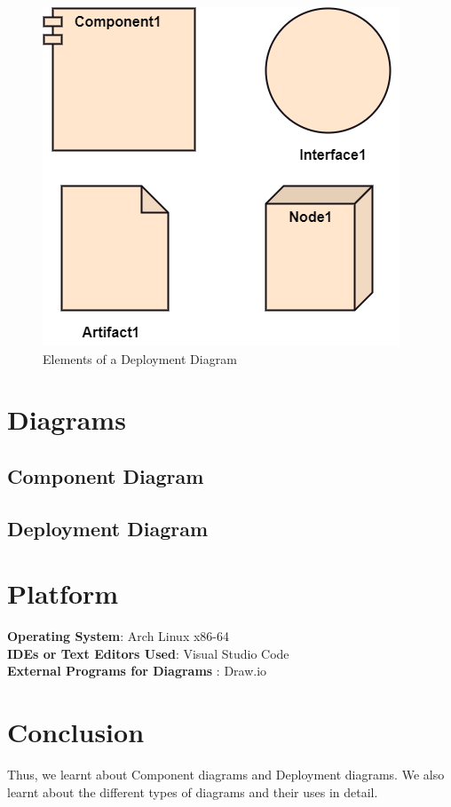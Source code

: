 \documentclass[11pt]{article}
\begin{document}
\begin{figure}[H]
	\centering
	\includegraphics[width=.45\textwidth]{uml-deployment-diagram.png}
	\caption{Elements of a Deployment Diagram}
\end{figure}

\clearpage

\section{Diagrams}

\subsection{Component Diagram}


\subsection{Deployment Diagram}


\section{Platform}
\textbf{Operating System}: Arch Linux x86-64 \\
\textbf{IDEs or Text Editors Used}: Visual Studio Code\\
\textbf{External Programs for Diagrams} : Draw.io\\


\section{Conclusion}
Thus, we learnt about Component diagrams and Deployment diagrams. We also learnt about the different types of diagrams and their uses in detail.
\clearpage
\end{document}
